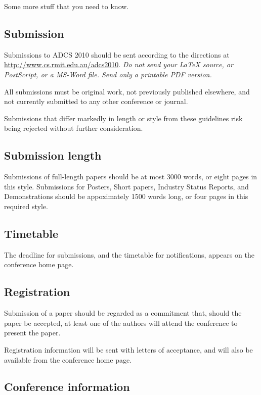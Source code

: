 \documentclass[twocolumn]{article}
\begin{document}
Some more stuff that you need to know.

\subsection{Submission}

Submissions to ADCS 2010 should be sent according to the directions at
\url{http://www.cs.rmit.edu.au/adcs2010}.  \emph{Do not send your {\LaTeX}
  source, or PostScript, or a MS-Word file.  Send only a printable PDF
  version.}

All submissions must be original work, not previously published 
elsewhere, and not currently submitted to any other conference or
journal.

Submissions that differ markedly in length or style from these
guidelines risk being rejected without further consideration.

\subsection{Submission length}

Submissions of full-length papers should be at most 3000 words, or
eight pages in this style.  Submissions for Posters, Short papers,
Industry Status Reports, and Demonstrations should be appoximately
1500 words long, or four pages in this required style.

\subsection{Timetable}

The deadline for submissions, and the timetable for notifications,
appears on the conference home page.

\subsection{Registration}

Submission of a paper should be regarded as a commitment that, should
the paper be accepted, at least one of the authors will attend the
conference to present the paper.

Registration information will be sent with letters of acceptance, and
will also be available from the conference home page.

\subsection{Conference information}
\end{document}
